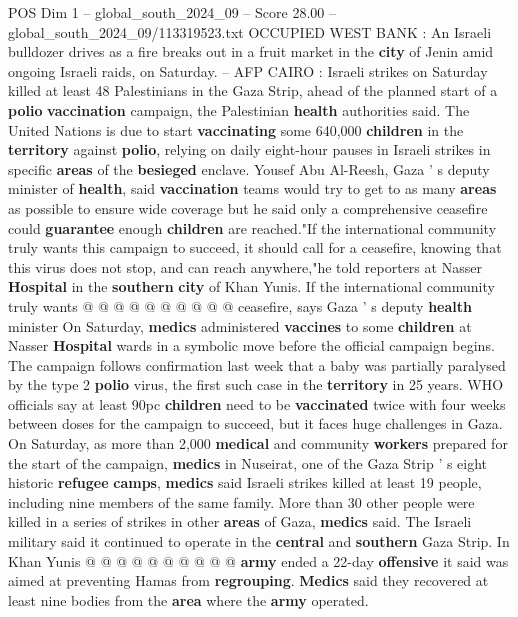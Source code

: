 \begin{textsample}{POS Dim 1 – global\_south\_2024\_09 – Score 28.00 – global\_south\_2024\_09/113319523.txt}  \label{ex:f1_pos_204}
OCCUPIED WEST BANK : An Israeli bulldozer drives as a fire breaks out in a fruit market in the \textbf{city} of Jenin amid ongoing Israeli raids, on Saturday. -- AFP CAIRO : Israeli strikes on Saturday killed at least 48 Palestinians in the Gaza Strip, ahead of the planned start of a \textbf{polio} \textbf{vaccination} campaign, the Palestinian \textbf{health} authorities said.
The United Nations is due to start \textbf{vaccinating} some 640,000 \textbf{children} in the \textbf{territory} against \textbf{polio}, relying on daily eight-hour pauses in Israeli strikes in specific \textbf{areas} of the \textbf{besieged} enclave.
Yousef Abu Al-Reesh, Gaza ' s deputy minister of \textbf{health}, said \textbf{vaccination} teams would try to get to as many \textbf{areas} as possible to ensure wide coverage but he said only a comprehensive ceasefire could \textbf{guarantee} enough \textbf{children} are reached."If the international community truly wants this campaign to succeed, it should call for a ceasefire, knowing that this virus does not stop, and can reach anywhere,"he told reporters at Nasser \textbf{Hospital} in the \textbf{southern} \textbf{city} of Khan Yunis.
If the international community truly wants @ @ @ @ @ @ @ @ @ @ ceasefire, says Gaza ' s deputy \textbf{health} minister On Saturday, \textbf{medics} administered \textbf{vaccines} to some \textbf{children} at Nasser \textbf{Hospital} wards in a symbolic move before the official campaign begins.
The campaign follows confirmation last week that a baby was partially paralysed by the type 2 \textbf{polio} virus, the first such case in the \textbf{territory} in 25 years.
WHO officials say at least 90pc \textbf{children} need to be \textbf{vaccinated} twice with four weeks between doses for the campaign to succeed, but it faces huge challenges in Gaza.
On Saturday, as more than 2,000 \textbf{medical} and community \textbf{workers} prepared for the start of the campaign, \textbf{medics} in Nuseirat, one of the Gaza Strip ' s eight historic \textbf{refugee} \textbf{camps}, \textbf{medics} said Israeli strikes killed at least 19 people, including nine members of the same family.
More than 30 other people were killed in a series of strikes in other \textbf{areas} of Gaza, \textbf{medics} said.
The Israeli military said it continued to operate in the \textbf{central} and \textbf{southern} Gaza Strip.
In Khan Yunis @ @ @ @ @ @ @ @ @ @ \textbf{army} ended a 22-day \textbf{offensive} it said was aimed at preventing Hamas from \textbf{regrouping}. \textbf{Medics} said they recovered at least nine bodies from the \textbf{area} where the \textbf{army} operated.

\end{textsample}
